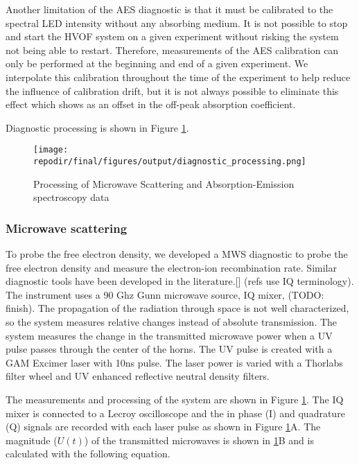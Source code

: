 Another limitation of the AES diagnostic is that it must be calibrated to the spectral LED intensity without any absorbing medium. It is not possible to stop and start the HVOF system on a given experiment without risking the system not being able to restart. Therefore, measurements of the AES calibration can only be performed at the beginning and end of a given experiment. We interpolate this calibration throughout the time of the experiment to help reduce the influence of calibration drift, but it is not always possible to eliminate this effect which shows as an offset in the off-peak absorption coefficient.

Diagnostic processing is shown in Figure \ref{fig:diagnostic_processing}.

\begin{figure}[h]
    \texttt{[image: \\repodir/final/figures/output/diagnostic\_processing.png]} 
    \caption{Processing of Microwave Scattering and Absorption-Emission spectroscopy data}
    \label{fig:diagnostic_processing}
\end{figure}


\subsubsection{Microwave scattering}

To probe the free electron density, we developed a MWS diagnostic to probe the free electron density and measure the electron-ion recombination rate. Similar diagnostic tools have been developed in the literature.[] (refs use IQ terminology). The instrument uses a 90 Ghz Gunn microwave source, IQ mixer, (TODO: finish). The propagation of the radiation through space is not well characterized, so the system measures relative changes instead of absolute transmission. The system measures the change in the transmitted microwave power when a UV pulse passes through the center of the horns. The UV pulse is created with a GAM Excimer laser with 10ns pulse. The laser power is varied with a Thorlabs filter wheel and UV enhanced reflective neutral density filters. 

The measurements and processing of the system are shown in Figure \ref{fig:diagnostic_processing}. The IQ mixer is connected to a Lecroy oscilloscope and the in phase (I) and quadrature (Q) signals are recorded with each laser pulse as shown in Figure \ref{fig:diagnostic_processing}A. The magnitude ($U(t)$) of the transmitted microwaves is shown in \ref{fig:diagnostic_processing}B and is calculated with the following equation. 

